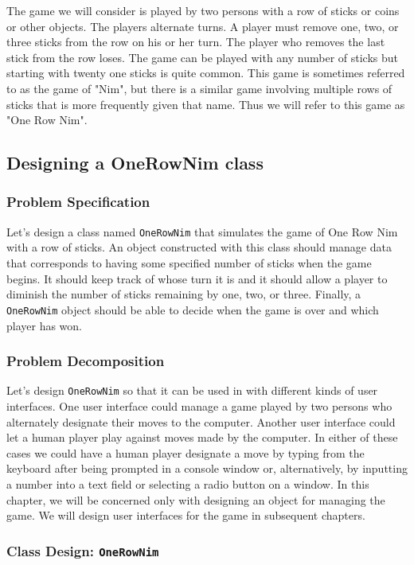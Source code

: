 The game we will consider is played by two persons with a row of
sticks or coins or other objects. The players alternate turns.  A
player must remove one, two, or three sticks from the row on his or
her turn.  The player who removes the last stick from the row loses.
The game can be played with any number of sticks but starting with
twenty one sticks is quite common.  This game is sometimes referred to
as the game of "Nim", but there is a similar game involving multiple
rows of sticks that is more frequently given that name.  Thus we will
refer to this game as "One Row Nim".

\subsection{Designing a OneRowNim class}
\subsubsection*{Problem Specification}

\noindent  Let's design a class named {\tt OneRowNim} that simulates
the game of One Row Nim with a row of sticks.  An object constructed
with this class should manage data that corresponds to having some
specified number of sticks when the game begins.  It should keep track
of whose turn it is and it should allow a player to diminish the
number of sticks remaining by one, two, or three.  Finally, a {\tt
OneRowNim} object should be able to decide when the game is over and
which player has won.

\subsubsection*{Problem Decomposition}
\noindent Let's design {\tt OneRowNim} so that it can be used in 
with different kinds of user interfaces. One user interface could
manage a game played by two persons who alternately designate their
moves to the computer. Another user interface could let a human player
play against moves made by the computer.  In either of these cases we
could have a human player designate a move by typing from the keyboard
after being prompted in a console window or, alternatively, by
inputting a number into a text field or selecting a radio button on a
window.  In this chapter, we will be concerned only with designing an
object for managing the game. We will design user interfaces for the
game in subsequent chapters.

\subsubsection*{Class Design: {\tt OneRowNim}}

